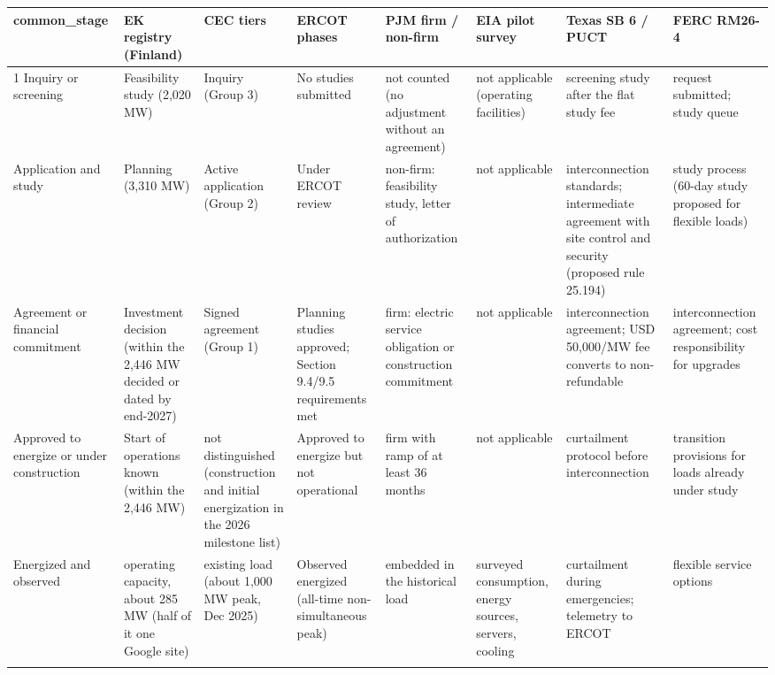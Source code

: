 \begin{tabular}{p{2.1cm}p{2.5cm}p{2.4cm}p{2.6cm}p{2.5cm}p{2.1cm}p{2.8cm}p{2.5cm}}
\toprule
common\_stage & EK registry (Finland) & CEC tiers & ERCOT phases & PJM firm / non-firm & EIA pilot survey & Texas SB 6 / PUCT & FERC RM26-4 \\
\midrule
1 Inquiry or screening & Feasibility study (2,020 MW) & Inquiry (Group 3) & No studies submitted & not counted (no adjustment without an agreement) & not applicable (operating facilities) & screening study after the flat study fee & request submitted; study queue \\
\addlinespace
2 Application and study & Planning (3,310 MW) & Active application (Group 2) & Under ERCOT review & non-firm: feasibility study, letter of authorization & not applicable & interconnection standards; intermediate agreement with site control and security (proposed rule 25.194) & study process (60-day study proposed for flexible loads) \\
\addlinespace
3 Agreement or financial commitment & Investment decision (within the 2,446 MW decided or dated by end-2027) & Signed agreement (Group 1) & Planning studies approved; Section 9.4/9.5 requirements met & firm: electric service obligation or construction commitment & not applicable & interconnection agreement; USD 50,000/MW fee converts to non-refundable & interconnection agreement; cost responsibility for upgrades \\
\addlinespace
4 Approved to energize or under construction & Start of operations known (within the 2,446 MW) & not distinguished (construction and initial energization in the 2026 milestone list) & Approved to energize but not operational & firm with ramp of at least 36 months & not applicable & curtailment protocol before interconnection & transition provisions for loads already under study \\
\addlinespace
5 Energized and observed & operating capacity, about 285 MW (half of it one Google site) & existing load (about 1,000 MW peak, Dec 2025) & Observed energized (all-time non-simultaneous peak) & embedded in the historical load & surveyed consumption, energy sources, servers, cooling & curtailment during emergencies; telemetry to ERCOT & flexible service options \\
\addlinespace
\bottomrule
\end{tabular}